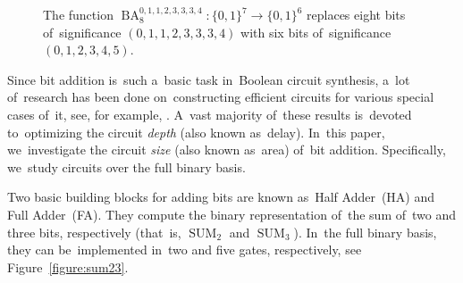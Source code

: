 \documentclass[sigconf, review, anonymous]{acmart}
\DeclareMathOperator{\SUM}{SUM}
\DeclareMathOperator{\BA}{BA}
\begin{document}
\begin{figure}%
	\begin{center}
	\end{center}
	\caption{The function $\BA_8^{0,1,1,2,3,3,3,4} \colon \{0,1\}^7 \to \{0,1\}^6$ replaces eight bits of~significance $(0,1,1,2,3,3,3,4)$ with six bits of~significance $(0,1,2,3,4,5)$.}
	\label{figure:baexample}
\end{figure}

Since bit addition is~such a~basic task in~Boolean circuit synthesis,
a~lot of~research has been done on~constructing efficient circuits
for various special cases of~it, see, for example,
\cite{DBLP:journals/cc/PatersonZ93,
    DBLP:conf/arith/MartelORS95,
    DBLP:journals/tc/StellingMOR98,
    DBLP:conf/arith/BickerstaffSS01}.
A~vast majority of~these results is~devoted to~optimizing the circuit \emph{depth} (also known as~delay).
In~this paper, we~investigate the circuit \emph{size} (also known as~area) of~bit addition. Specifically, we~study circuits over the full binary basis.

Two basic building blocks for adding bits are known as~Half Adder~(HA)
and Full Adder~(FA). They compute the binary representation of~the sum
of~two and three bits, respectively (that~is, $\SUM_2$ and $\SUM_3$).
In~the full binary basis, they can be~implemented in~two and five gates, respectively, see Figure~\ref{figure:sum23}.
\end{document}

